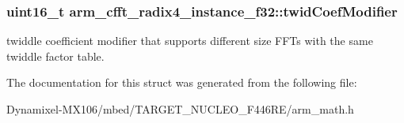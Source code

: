 \subsubsection[{\texorpdfstring{twid\+Coef\+Modifier}{twidCoefModifier}}]{\setlength{\rightskip}{0pt plus 5cm}uint16\+\_\+t arm\+\_\+cfft\+\_\+radix4\+\_\+instance\+\_\+f32\+::twid\+Coef\+Modifier}\hypertarget{structarm__cfft__radix4__instance__f32_abe31ea2157dfa233e389cdfd3b9993ee}{}\label{structarm__cfft__radix4__instance__f32_abe31ea2157dfa233e389cdfd3b9993ee}
twiddle coefficient modifier that supports different size F\+F\+Ts with the same twiddle factor table. 

The documentation for this struct was generated from the following file\+:\begin{DoxyCompactItemize}
\item 
Dynamixel-\/\+M\+X106/mbed/\+T\+A\+R\+G\+E\+T\+\_\+\+N\+U\+C\+L\+E\+O\+\_\+\+F446\+R\+E/arm\+\_\+math.\+h\end{DoxyCompactItemize}
